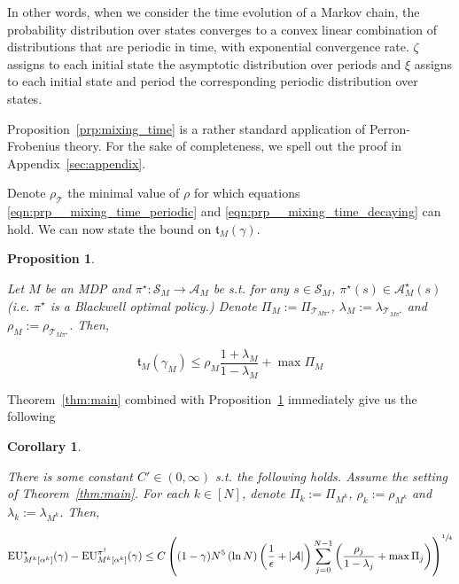 \documentclass[11pt]{article}
\theoremstyle{definition}
\theoremstyle{plain}
\newtheorem{proposition}{Proposition}%
\newtheorem{corollary}{Corollary}%
\newcommand{\AP}[1]{\left(#1\right)}
\newcommand{\AB}[1]{\left[#1\right]}
\newcommand{\Abs}[1]{\left\vert #1 \right\vert}
\newcommand{\A}{\mathcal{A}}
\newcommand{\St}{\mathcal{S}}
\newcommand{\T}{\mathcal{T}}
\newcommand{\EU}{\operatorname{EU}}
\newcommand{\Tn}{\mathfrak{t}}
\newcommand{\Ad}{\alpha}
\begin{document}
In other words, when we consider the time evolution of a Markov chain, the probability distribution over states converges to a convex linear combination of distributions that are periodic in time, with exponential convergence rate. $\zeta$ assigns to each initial state the asymptotic distribution over periods and $\xi$ assigns to each initial state and period the corresponding periodic distribution over states.

Proposition~\ref{prp:mixing_time} is a rather standard application of Perron-Frobenius theory. For the sake of completeness, we spell out the proof in Appendix~\ref{sec:appendix}.

Denote $\rho_\T$ the minimal value of $\rho$ for which equations \ref{eqn:prp__mixing_time_periodic} and \ref{eqn:prp__mixing_time_decaying} can hold. We can now state the bound on $\Tn_M(\gamma)$.

\begin{samepage}
\begin{proposition}
\label{prp:transient}

Let $M$ be an MDP and $\pi^\star: \St_M \rightarrow \A_M$ be s.t. for any $s \in \St_M$, $\pi^\star(s)\in\A_M^\star(s)$ (i.e. $\pi^\star$ is a Blackwell optimal policy.) Denote $\Pi_M:=\Pi_{\T_{M\pi^\star}}$, $\lambda_M:=\lambda_{\T_{M\pi^\star}}$ and $\rho_M:=\rho_{\T_{M\pi^\star}}$. Then,

\begin{equation}
\Tn_M\AP{\gamma_M} \leq \rho_M \frac{1+\lambda_M}{1-\lambda_M} + \max{\Pi_M}
\end{equation}

\end{proposition}
\end{samepage}

Theorem~\ref{thm:main} combined with Proposition~\ref{prp:transient} immediately give us the following

\begin{samepage}
\begin{corollary}
\label{crl:main}

There is some constant $C' \in (0,\infty)$ s.t. the following holds. Assume the setting of Theorem~\ref{thm:main}. For each $k \in [N]$, denote $\Pi_k:=\Pi_{M^k}$, $\rho_k:=\rho_{M^k}$ and $\lambda_k:=\lambda_{M^k}$. Then,

\begin{equation}
\EU_{M^k\AB{\Ad^k}}^\star(\gamma) - \EU_{M^k\AB{\Ad^k}}^{\pi^\dagger}(\gamma) \leq C\AP{(1-\gamma)N^5 \AP{\ln N} \AP{\frac{1}{\epsilon}+\Abs{\A}}\sum_{j=0}^{N-1} \AP{\frac{\rho_j}{1-\lambda_j}+\max{\Pi_j}}}^{\sfrac{1}{4}}
\end{equation}

\end{corollary}
\end{samepage}
\end{document}
